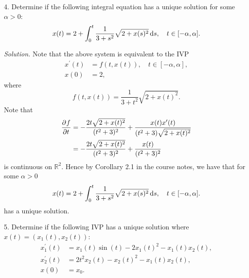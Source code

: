 \documentclass{article}
\newcommand{\R}{\mathbb{R}}
\begin{document}
\newpage

4. Determine if the following integral equation has a unique solution for some $\alpha > 0$:
%
\begin{equation*}
    x(t) = 2 + \int_0^t \frac{1}{3 + s^2} \sqrt{2 + x(s)^2} \dif s, \quad t \in [-\alpha, \alpha]
    .
\end{equation*}

\textit{Solution.}
Note that the above system is equivalent to the IVP
%
\begin{align*}
    x^\prime(t) &= f(t, x(t)), \quad t \in [-\alpha, \alpha], \\
    x(0) &= 2,
\end{align*}
%
where
%
\begin{equation*}
    f(t, x(t)) = \frac{1}{3 + t^2} \sqrt{2 + x(t)^2}.
\end{equation*}
%
Note that
%
\begin{align*}
    \dpd{f}{t}
        &= - \frac{2 t \sqrt{2 + x(t)^2}}{(t^2 + 3)^2}
            + \frac{x(t) x^\prime(t)}{(t^2 + 3) \sqrt{2 + x(t)^2}} \\
        &= - \frac{2 t \sqrt{2 + x(t)^2}}{(t^2 + 3)^2}
            + \frac{x(t)}{(t^2 + 3)^2}
\end{align*}
%
is continuous on $\R^2$. Hence by Corollary 2.1 in the course notes,
we have that for some $\alpha > 0$
%
\begin{equation*}
    x(t) = 2 + \int_0^t \frac{1}{3 + s^2} \sqrt{2 + x(s)^2} \dif s, \quad t \in [-\alpha, \alpha]
    .
\end{equation*}
%
has a unique solution.

\newpage

5. Determine if the following IVP has a unique solution where $x(t) = (x_1(t), x_2(t))$:
%
\begin{align*}
    x_1^\prime(t) &= x_1(t) \sin(t) - 2 x_1(t)^2 - x_1(t) x_2(t), \\
    x_2^\prime(t) &= 2 t^2 x_2(t) - x_2(t)^2 - x_1(t) x_2(t), \\
    x(0) &= x_0.
\end{align*}
\end{document}
